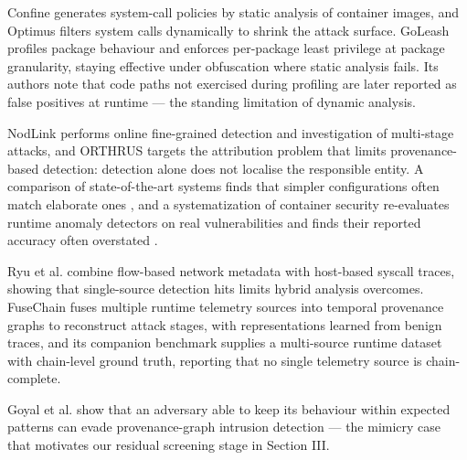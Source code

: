 \documentclass[conference]{IEEEtran}
\begin{document}
Confine \cite{ghavamnia2020} generates system-call policies by static
analysis of container images, and Optimus \cite{yang2024} filters
system calls dynamically to shrink the attack surface. GoLeash
\cite{goleash2025} profiles package behaviour and enforces per-package
least privilege at package granularity, staying effective under
obfuscation where static analysis fails. Its authors note that code
paths not exercised during profiling are later reported as false
positives at runtime --- the standing limitation of dynamic analysis.

NodLink \cite{nodlink2024} performs online fine-grained detection and
investigation of multi-stage attacks, and ORTHRUS \cite{orthrus2025}
targets the attribution problem that limits provenance-based detection:
detection alone does not localise the responsible entity. A comparison
of state-of-the-art systems finds that simpler configurations often
match elaborate ones \cite{bilot2025}, and a systematization of
container security re-evaluates runtime anomaly detectors on real
vulnerabilities and finds their reported accuracy often overstated
\cite{haq2024}.

Ryu et al. \cite{ryu2026} combine flow-based network metadata with
host-based syscall traces, showing that single-source detection hits
limits hybrid analysis overcomes. FuseChain \cite{fusechain2026} fuses
multiple runtime telemetry sources into temporal provenance graphs to
reconstruct attack stages, with representations learned from benign
traces, and its companion benchmark \cite{synthchain2026} supplies a
multi-source runtime dataset with chain-level ground truth, reporting
that no single telemetry source is chain-complete.

Goyal et al. \cite{goyal2023} show that an adversary able to keep its
behaviour within expected patterns can evade provenance-graph intrusion
detection --- the mimicry case that motivates our residual screening
stage in Section III.
\end{document}
